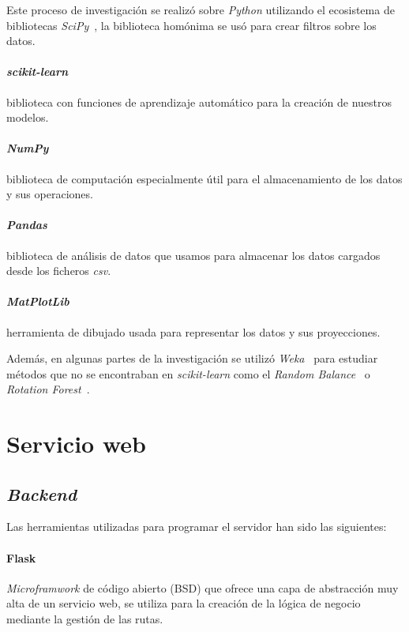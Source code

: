 Este proceso de investigación se realizó sobre \textit{Python} utilizando el ecosistema de bibliotecas \textit{SciPy}~\cite{tool:scipy}, la biblioteca homónima se usó para crear filtros sobre los datos.

\paragraph{\textit{scikit-learn}~\cite{tool:scikit-learn}}biblioteca con funciones de aprendizaje automático para la creación de nuestros modelos.
\paragraph{\textit{NumPy}~\cite{tool:numpy}}biblioteca de computación especialmente útil para el almacenamiento de los datos y sus operaciones.
\paragraph{\textit{Pandas}~\cite{tool:pandas}}biblioteca de análisis de datos que usamos para almacenar los datos cargados desde los ficheros \textit{csv}.
\paragraph{\textit{MatPlotLib}~\cite{tool:matplotlib}}herramienta de dibujado usada para representar los datos y sus proyecciones.

Además, en algunas partes de la investigación se utilizó \textit{Weka}~\cite{tool:weka} para estudiar métodos que no se encontraban en \textit{scikit-learn} como el \textit{Random Balance}~\cite{diez2015random} o \textit{Rotation Forest}~\cite{rodriguez2006rotation}.

\section{Servicio web}

\subsection{\textit{Backend}}

Las herramientas utilizadas para programar el servidor han sido las siguientes:
\paragraph{Flask~\cite{tool:flask}}\textit{Microframwork} de código abierto (BSD) que ofrece una capa de abstracción muy alta de un servicio web, se utiliza para la creación de la lógica de negocio mediante la gestión de las rutas.
